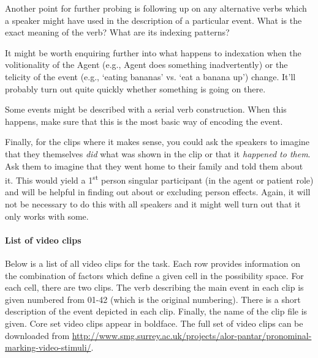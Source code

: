   Another point for further probing is following up on any alternative verbs which a speaker might have used in the description of a particular event. What is the exact meaning of the verb? What are its indexing patterns?

  It might be worth enquiring further into what happens to indexation when the volitionality of the Agent (e.g., Agent does something inadvertently) or the telicity of the event (e.g., `eating bananas' vs. `eat a banana up') change. It'll probably turn out quite quickly whether something is going on there.

  Some events might be described with a serial verb construction. When this happens, make sure that this is the most basic way of encoding the event. 

  Finally, for the clips where it makes sense, you could ask the speakers to imagine that they themselves \textit{did} what was shown in the clip or that it \textit{happened to them}. Ask them to imagine that they went home to their family and told them about it. This would yield a 1\textsuperscript{st} person singular participant (in the agent or patient role) and will be helpful in finding out about or excluding person effects. Again, it will not be necessary to do this with all speakers and it might well turn out that it only works with some.

\paragraph{List of video clips}

Below is a list of all video clips for the task. Each row provides information on the combination of factors which define a given cell in the possibility space. For each cell, there are two clips. The verb describing the main event in each clip is given numbered from 01-42 (which is the original numbering). There is a short description of the event depicted in each clip. Finally, the name of the clip file is given. Core set video clips appear in boldface. The full set of video clips can be downloaded from \url{http://www.smg.surrey.ac.uk/projects/alor-pantar/pronominal-marking-video-stimuli/}.\enlargethispage{4em}



